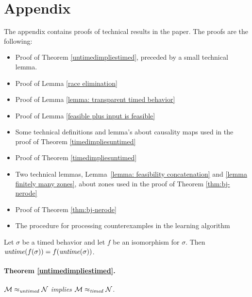 \section{Appendix}
The appendix contains proofs of technical results in the paper.
The proofs are the following:
\begin{itemize}
\item
Proof of Theorem \ref{untimedimpliestimed}, preceded by a small technical lemma.
\item 
Proof of Lemma \ref{race elimination}
\item 
Proof of Lemma \ref{lemma: transparent timed behavior}
\item 
Proof of Lemma \ref{feasible plus input is feasible}
\item 
Some technical definitions and lemma's about causality maps used in the proof of
Theorem \ref{timedimpliesuntimed}
\item 
Proof of Theorem \ref{timedimpliesuntimed}
\item 
  Two technical lemmas, Lemma~\ref{lemma: feasibility concatenation} and
  \ref{lemma finitely many zones},
about zones used in the proof of Theorem \ref{thm:bj-nerode}
\item 
Proof of Theorem \ref{thm:bj-nerode}
\item
  The procedure for processing counterexamples in the learning algorithm
\end{itemize}

\begin{lemma}
\label{lemma isomorphism}
Let $\sigma$ be a timed behavior and let $f$ be an isomorphism for $\sigma$.
Then $\mathit{untime}(f(\sigma)) = f(\mathit{untime}(\sigma))$.
\end{lemma}

\paragraph{Theorem \ref{untimedimpliestimed}.}
\emph{${\mathcal M} \approx_{\mathit{untimed}} {\mathcal N}$
implies
${\mathcal M} \approx_{\mathit{timed}} {\mathcal N}$.}

